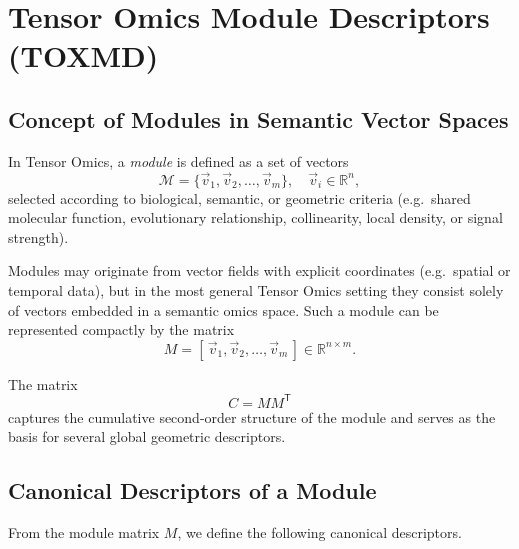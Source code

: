 \section{Tensor Omics Module Descriptors (TOXMD)}\label{sec:module_descriptors}

    \subsection{Concept of Modules in Semantic Vector Spaces}

        In Tensor Omics, a \textit{module} is defined as a set of vectors
        \[
            \mathcal{M} = \{ \vec{v}_1, \vec{v}_2, \ldots, \vec{v}_m \}, \quad
            \vec{v}_i \in \mathbb{R}^n,
        \]
        selected according to biological, semantic, or geometric criteria
        (e.g.\ shared molecular function, evolutionary relationship, collinearity,
        local density, or signal strength).

        Modules may originate from vector fields with explicit coordinates
        (e.g.\ spatial or temporal data), but in the most general Tensor Omics setting
        they consist solely of vectors embedded in a semantic omics space.
        Such a module can be represented compactly by the matrix
        \[
            M = [\, \vec{v}_1, \vec{v}_2, \ldots, \vec{v}_m \,] \in \mathbb{R}^{n \times m}.
        \]

        The matrix
        \[
            C = M M^{\mathsf{T}}
        \]
        captures the cumulative second-order structure of the module and serves as the
        basis for several global geometric descriptors.

    \subsection{Canonical Descriptors of a Module}\label{ssec:canonical_module_descriptors}

        From the module matrix \(M\), we define the following canonical descriptors.

